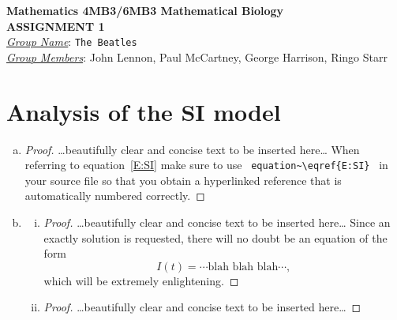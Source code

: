 \documentclass[12pt]{article}
\begin{document}
\begin{center}
{\bfseries Mathematics 4MB3/6MB3 Mathematical Biology\\
 ASSIGNMENT {\color{blue}1}}\\
\medskip
\underline{\emph{Group Name}}: \texttt{{\color{blue}The Beatles}}\\
\medskip
\underline{\emph{Group Members}}: {\color{blue}John Lennon, Paul McCartney, George Harrison, Ringo Starr}
\end{center}

\section{Analysis of the SI model}

\SIanalIntro
\begin{enumerate}[(a)]
\item \SIanalQa

  {\color{blue}
    \begin{proof}
      {\color{magenta}\dots beautifully clear and concise text to be inserted here\dots}
      When referring to equation~\eqref{E:SI} make sure to use ~\verb|equation~\eqref{E:SI}|~ in your source file so that you obtain a hyperlinked reference that is automatically numbered correctly.
    \end{proof}
  }

\item \SIanalQb
  \begin{enumerate}[(i)]
  \item \SIanalQbi

    {\color{blue}
      \begin{proof}
        {\color{magenta}\dots beautifully clear and concise text to be inserted here\dots}
        Since an exactly solution is requested, there will no doubt be an equation of the form
        \begin{equation}
          I(t) = \cdots \text{blah blah blah} \cdots ,
        \end{equation}
        which will be extremely enlightening.
      \end{proof}
    }

  \item \SIanalQbii

    {\color{blue}
      \begin{proof}
        {\color{magenta}\dots beautifully clear and concise text to be inserted here\dots}
      \end{proof}
    }

  \end{enumerate}
\end{enumerate}
\end{document}
